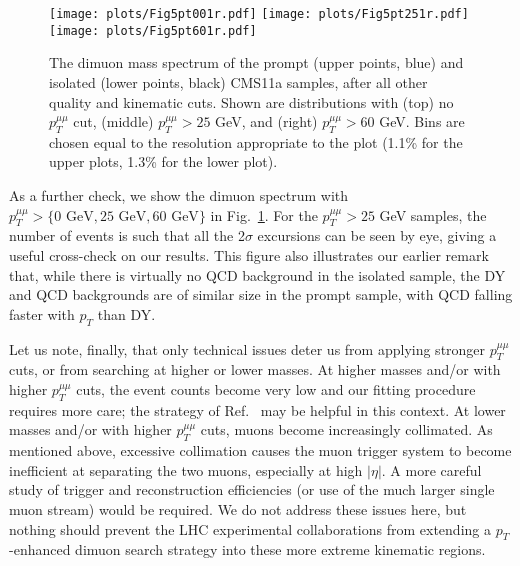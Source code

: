 \documentclass[aps,prd,twocolumn,superscriptaddress,preprintnumbers,nofootinbib,longbibliography,floatfix]{revtex4-1}
\newcommand{\nameofsearch}{$p_T$-enhanced }
\newcommand{\ptmm}{p_T^{\mu\mu}}
\newcommand{\GeV}{\text{~GeV}}
\DeclareRobustCommand{\Fig}[1]{Fig.~\ref{#1}}
\DeclareRobustCommand{\Ref}[1]{Ref.~\cite{#1}}
\begin{document}
%
\begin{figure}  
\begin{center}  
\texttt{[image: plots/Fig5pt001r.pdf]}
\texttt{[image: plots/Fig5pt251r.pdf]}
\texttt{[image: plots/Fig5pt601r.pdf]} 
\end{center}
\caption{The dimuon mass spectrum of the prompt (upper points, blue) and isolated (lower points, black) CMS11a samples, after all other quality and kinematic cuts. 
Shown are distributions with (top) no $\ptmm$ cut, (middle) $\ptmm>25$ GeV, and (right) $\ptmm>60$ GeV.  Bins are chosen equal to the resolution appropriate to the plot (1.1\% for the upper plots, 1.3\% for the lower plot).
%
} 
\label{fig:CompareP25PrVsIso}
\end{figure}

As a further check, we show the dimuon spectrum with $\ptmm> \{0 \GeV,25 \GeV,60 \GeV\}$ in \Fig{fig:CompareP25PrVsIso}.
%
 For the $\ptmm>25$ GeV samples, the number of events is such that all the 2$\sigma$ excursions can be seen by eye, giving a useful cross-check on our results.
%
This figure also illustrates our earlier remark that, while there is virtually no QCD background in the isolated sample, the DY and QCD backgrounds are of similar size in the prompt sample, with QCD falling faster  with $p_T$ than DY.




Let us note, finally, that only technical issues deter us from applying stronger $\ptmm$ cuts, or from searching at higher or lower masses.
%
At higher masses and/or with higher $\ptmm$ cuts, the event counts become very low and our fitting procedure requires more care; the strategy of \Ref{Williams:2015xfa} may be helpful in this context. 
%
At lower masses and/or with higher $\ptmm$ cuts, muons become increasingly collimated.
%
As mentioned above, excessive collimation causes the muon trigger system to become inefficient at separating the two muons, especially at high $|\eta|$.
%
A more careful study of trigger and reconstruction efficiencies (or use of the much larger single muon stream) would be required.
%
We do not address these issues here, but nothing should prevent the LHC experimental collaborations from extending a \nameofsearch dimuon search strategy into these more extreme kinematic regions.



\end{document}
